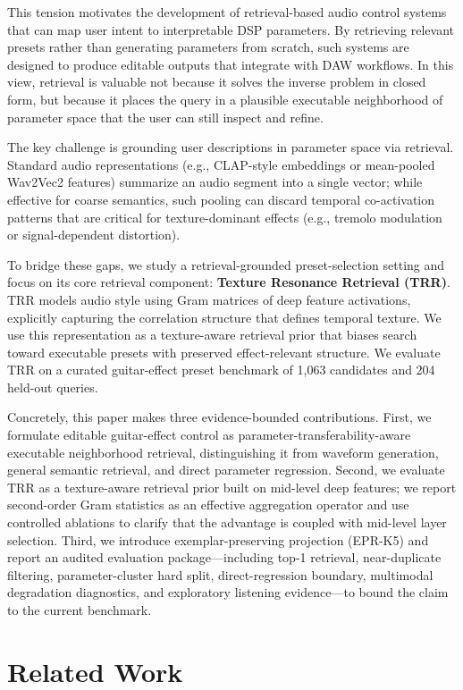 This tension motivates the development of retrieval-based audio control systems that can map user intent to interpretable DSP parameters. By retrieving relevant presets rather than generating parameters from scratch, such systems are designed to produce editable outputs that integrate with DAW workflows. In this view, retrieval is valuable not because it solves the inverse problem in closed form, but because it places the query in a plausible executable neighborhood of parameter space that the user can still inspect and refine.

The key challenge is grounding user descriptions in parameter space via retrieval. Standard audio representations (e.g., CLAP-style embeddings or mean-pooled Wav2Vec2 features) summarize an audio segment into a single vector; while effective for coarse semantics, such pooling can discard temporal co-activation patterns that are critical for texture-dominant effects (e.g., tremolo modulation or signal-dependent distortion).

To bridge these gaps, we study a retrieval-grounded preset-selection setting and focus on its core retrieval component: \textbf{Texture Resonance Retrieval (TRR)}. TRR models audio style using Gram matrices of deep feature activations, explicitly capturing the correlation structure that defines temporal texture. We use this representation as a texture-aware retrieval prior that biases search toward executable presets with preserved effect-relevant structure. We evaluate TRR on a curated guitar-effect preset benchmark of 1,063 candidates and 204 held-out queries.

Concretely, this paper makes three evidence-bounded contributions. First, we formulate editable guitar-effect control as parameter-transferability-aware executable neighborhood retrieval, distinguishing it from waveform generation, general semantic retrieval, and direct parameter regression. Second, we evaluate TRR as a texture-aware retrieval prior built on mid-level deep features; we report second-order Gram statistics as an effective aggregation operator and use controlled ablations to clarify that the advantage is coupled with mid-level layer selection. Third, we introduce exemplar-preserving projection (EPR-K5) and report an audited evaluation package---including top-1 retrieval, near-duplicate filtering, parameter-cluster hard split, direct-regression boundary, multimodal degradation diagnostics, and exploratory listening evidence---to bound the claim to the current benchmark.

\section{Related Work}
\label{sec:related_work}

